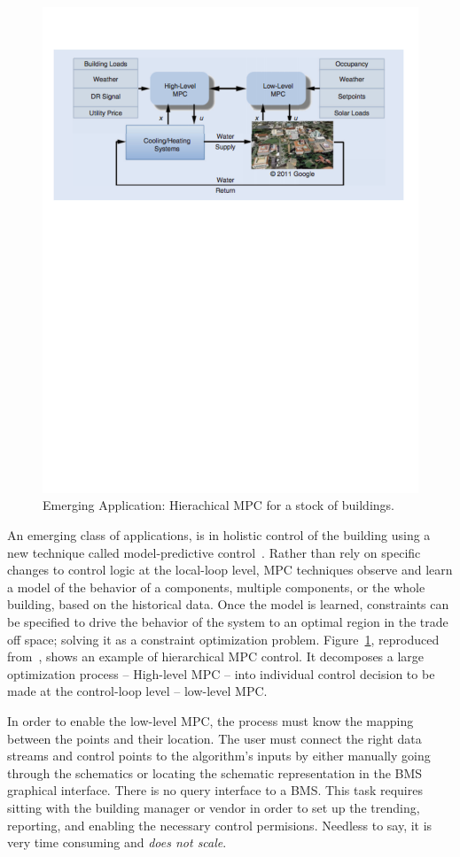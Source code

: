 \begin{figure}[t!] %
\centering
\includegraphics[width=0.75\columnwidth]{figs/mpc1}
\caption{Emerging Application: Hierachical MPC for a stock of buildings.}
\label{fig:mpc1}
\end{figure}

An emerging class of applications, is in holistic control of the building using a new technique called model-predictive control~\cite{MPC_yudong}.
Rather than rely on specific changes to control logic at the local-loop level, MPC techniques observe and learn a model
of the behavior of a components, multiple components, or the whole building, based on the historical data.  Once the model is learned, 
constraints can be specified to drive the behavior of the system to an optimal region in the trade off space; solving it as 
a constraint optimization problem.  Figure~\ref{fig:mpc1}, reproduced from~\cite{MPC_yudong}, shows an example of hierarchical MPC control.  
It decomposes a large optimization process -- High-level MPC --  into individual control decision to be made at the control-loop level --
low-level MPC.

In order to enable the low-level MPC, the process must know the mapping between the points and their location.
The user must connect the right data streams and control points to the algorithm's inputs by either manually going through the schematics or
locating the schematic representation in the BMS graphical interface.  There is no query interface to a BMS.  This task requires sitting 
with the building manager or vendor in order to set up the trending, reporting, and enabling the necessary control permisions.
Needless to say, it is very time consuming and \emph{does not scale}.

